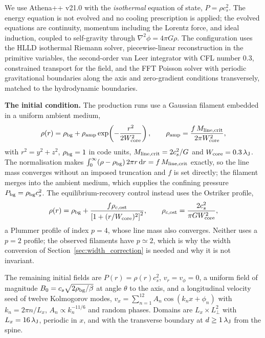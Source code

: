 \documentclass[usenatbib,twoside,twocolumn]{mnras}
\begin{document}
\smallskip We use Athena++ v21.0 \citep{Stone2020} with the \emph{isothermal} equation of state, $P=\rho c_s^2$. The energy equation is not evolved and no cooling prescription is applied; the evolved equations are continuity, momentum including the Lorentz force, and ideal induction, coupled to self-gravity through $\nabla^2\phi=4\pi G\rho$. The configuration uses the HLLD isothermal Riemann solver, piecewise-linear reconstruction in the primitive variables, the second-order van Leer integrator with CFL number $0.3$, constrained transport for the field, and the FFT Poisson solver with periodic gravitational boundaries along the axis and zero-gradient conditions transversely, matched to the hydrodynamic boundaries.

\smallskip\noindent\textbf{The initial condition.} The production runs use a Gaussian filament embedded in a uniform ambient medium,
\begin{equation}
\rho(r)=\rho_{\rm bg}+\rho_{\rm amp}\exp\!\left(-\frac{r^{2}}{2W_{\rm core}^{2}}\right),\qquad
\rho_{\rm amp}=\frac{f\,M_{\rm line,crit}}{2\pi W_{\rm core}^{2}},
\label{eq:ic_gauss}
\end{equation}
with $r^{2}=y^{2}+z^{2}$, $\rho_{\rm bg}=1$ in code units, $M_{\rm line,crit}=2c_s^{2}/G$ and $W_{\rm core}=0.3\,\lambda_{\rm J}$. The normalisation makes $\int_0^\infty(\rho-\rho_{\rm bg})\,2\pi r\,{\rm d}r=f\,M_{\rm line,crit}$ exactly, so the line mass converges without an imposed truncation and $f$ is set directly; the filament merges into the ambient medium, which supplies the confining pressure $P_{\rm bg}=\rho_{\rm bg}c_s^{2}$. The equilibrium-recovery control instead uses the Ostriker profile,
\begin{equation}
\rho(r)=\rho_{\rm bg}+\frac{f\rho_{c,\rm ost}}{\left[1+(r/W_{\rm core})^{2}\right]^{2}},\qquad
\rho_{c,\rm ost}=\frac{2c_s^{2}}{\pi G W_{\rm core}^{2}},
\label{eq:ic_ost}
\end{equation}
a Plummer profile of index $p=4$, whose line mass also converges. Neither uses a $p=2$ profile; the observed filaments have $p\simeq2$, which is why the width conversion of Section~\ref{sec:width_correction} is needed and why it is not invariant.

The remaining initial fields are $P(r)=\rho(r)c_s^{2}$, $v_r=v_\phi=0$, a uniform field of magnitude $B_0=c_s\sqrt{2\rho_{\rm bg}/\beta}$ at angle $\theta$ to the axis, and a longitudinal velocity seed of twelve Kolmogorov modes, $v_x=\sum_{n=1}^{12}A_n\cos(k_nx+\phi_n)$ with $k_n=2\pi n/L_x$, $A_n\propto k_n^{-11/6}$ and random phases. Domains are $L_x\times L_\perp^{2}$ with $L_x=16\,\lambda_{\rm J}$, periodic in $x$, and with the transverse boundary at $d\geq1\,\lambda_{\rm J}$ from the spine.
\end{document}
